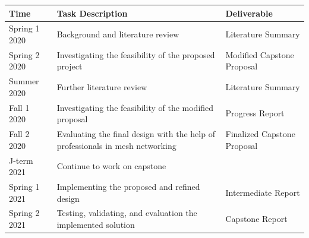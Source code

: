 \documentclass[conference]{IEEEtran}
\begin{document}
\begingroup
    \bigskip
    \centering
    \def\arraystretch{1.2}
        \begin{tabular}{lll}
            \toprule
            \textbf{Time} & \textbf{Task Description} & \textbf{Deliverable} \\
            \midrule
            Spring 1 2020 & Background and literature review & Literature Summary\\ 
            \midrule
            Spring 2 2020 & Investigating the feasibility of the proposed project & Modified Capstone Proposal\\ 
            \midrule
            Summer 2020 &   Further literature review  & Literature Summary\\ 
            \midrule
            Fall 1 2020 & Investigating the feasibility of the modified proposal  & Progress Report\\ 
            \midrule
            Fall 2 2020 & Evaluating the final design with the help of professionals in mesh networking  & Finalized Capstone Proposal\\ 
            \midrule
            J-term 2021 & Continue to work on capstone & \\ 
            \midrule
            Spring 1 2021 & Implementing the proposed and refined design & Intermediate Report\\ 
            \midrule
            Spring 2 2021 & Testing, validating, and evaluation the implemented solution  & Capstone Report\\ 
            \bottomrule
        \end{tabular}
    \label{fig:timeline}
    \medskip
\endgroup



\printbibliography
\end{document}
